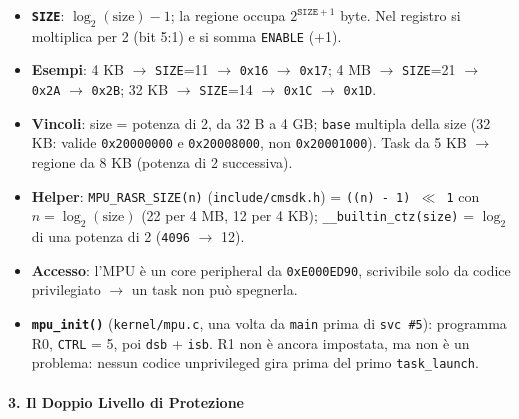 \begin{itemize}
    \item \textbf{\texttt{SIZE}}: $\log_2(\text{size}) - 1$; la regione occupa $2^{\texttt{SIZE}+1}$ byte. Nel registro si moltiplica per 2 (bit 5:1) e si somma \texttt{ENABLE} (+1).
    \item \textbf{Esempi}: 4 KB $\rightarrow$ \texttt{SIZE}=11 $\rightarrow$ \texttt{0x16} $\rightarrow$ \texttt{0x17}; 4 MB $\rightarrow$ \texttt{SIZE}=21 $\rightarrow$ \texttt{0x2A} $\rightarrow$ \texttt{0x2B}; 32 KB $\rightarrow$ \texttt{SIZE}=14 $\rightarrow$ \texttt{0x1C} $\rightarrow$ \texttt{0x1D}.
    \item \textbf{Vincoli}: size = potenza di 2, da 32 B a 4 GB; \texttt{base} multipla della size (32 KB: valide \texttt{0x20000000} e \texttt{0x20008000}, non \texttt{0x20001000}). Task da 5 KB $\rightarrow$ regione da 8 KB (potenza di 2 successiva).
    \item \textbf{Helper}: \texttt{MPU\_RASR\_SIZE(n)} (\texttt{include/cmsdk.h}) = \texttt{((n) - 1) $\ll$ 1} con $n = \log_2(\text{size})$ (22 per 4 MB, 12 per 4 KB); \texttt{\_\_builtin\_ctz(size)} = $\log_2$ di una potenza di 2 (\texttt{4096} $\rightarrow$ 12).
    \item \textbf{Accesso}: l'MPU è un core peripheral da \texttt{0xE000ED90}, scrivibile solo da codice privilegiato $\rightarrow$ un task non può spegnerla.
    \item \textbf{\texttt{mpu\_init()}} (\texttt{kernel/mpu.c}, una volta da \texttt{main} prima di \texttt{svc \#5}): programma R0, \texttt{CTRL} = 5, poi \texttt{dsb} + \texttt{isb}. R1 non è ancora impostata, ma non è un problema: nessun codice unprivileged gira prima del primo \texttt{task\_launch}.
\end{itemize}

\paragraph*{3. Il Doppio Livello di Protezione}

